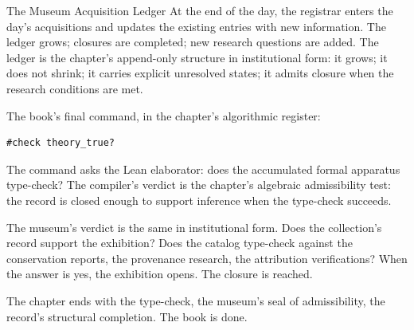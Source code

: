 \begin{coda}{The Museum Acquisition Ledger}
At the end of the day, the registrar enters the day's
acquisitions and updates the existing entries with new
information. The ledger grows; closures are completed; new
research questions are added. The ledger is the chapter's
append-only structure in institutional form: it grows; it
does not shrink; it carries explicit unresolved states; it
admits closure when the research conditions are met.

The book's final command, in the chapter's algorithmic register:

\begin{verbatim}
#check theory_true?
\end{verbatim}

The command asks the Lean elaborator: does the accumulated
formal apparatus type-check? The compiler's verdict is the
chapter's algebraic admissibility test: the record is closed
enough to support inference when the type-check succeeds.

The museum's verdict is the same in institutional form. Does the
collection's record support the exhibition? Does the catalog
type-check against the conservation reports, the provenance
research, the attribution verifications? When the answer is
yes, the exhibition opens. The closure is reached.

The chapter ends with the type-check, the museum's seal of
admissibility, the record's structural completion. The book is
done.

\end{coda}
